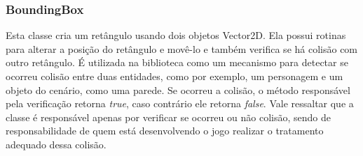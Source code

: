\subsubsection{BoundingBox}
%
%
Esta classe cria um retângulo usando dois objetos Vector2D. Ela possui rotinas para alterar a posição do retângulo e movê-lo e também verifica se há colisão com outro retângulo. É utilizada na biblioteca como um mecanismo para detectar se ocorreu colisão entre duas entidades, como por exemplo, um personagem e um objeto do cenário, como uma parede. Se ocorreu a colisão, o método responsável pela verificação retorna \textit{true}, caso contrário ele retorna \textit{false}. Vale ressaltar que a classe é responsável apenas por verificar se ocorreu ou não colisão, sendo de responsabilidade de quem está desenvolvendo o jogo realizar o tratamento adequado dessa colisão.
%
%
